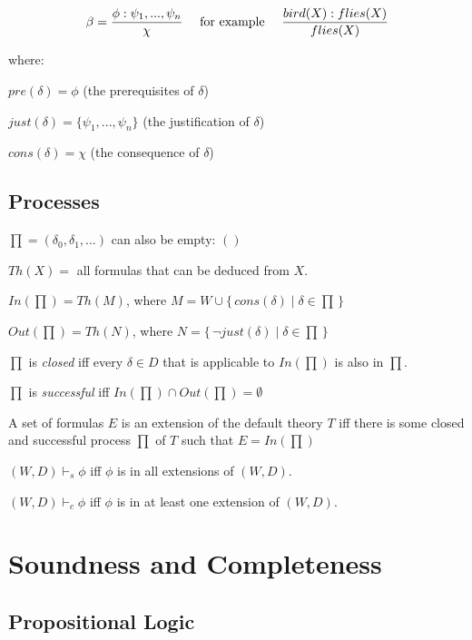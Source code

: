 \documentclass[a4paper]{article}
\begin{document}
\[
	\beta = \frac{\phi : \psi_1, ..., \psi_n}{\chi}
	\textrm{ \quad for example \quad }
	\frac{bird(X) : flies(X)}{flies(X)}
\]

where:
\begin{description}
	\item $pre(\delta) = \phi$ (the prerequisites of $\delta$)
	\item $just(\delta) = \lbrace \psi_1, ..., \psi_n \rbrace$ (the justification of $\delta$)
	\item $cons(\delta) = \chi$ (the consequence of $\delta$)
\end{description}

\subsection{Processes}

\begin{description}
	\item $\prod = (\delta_0, \delta_1, ...)$ \quad can also be empty: $()$
	\item $Th(X) = $ all formulas that can be deduced from $X$.
	\item $In(\prod) = Th(M)$, where $M = W \cup \lbrace\, cons(\delta) \;|\; \delta \in \prod \,\rbrace$
	\item $Out(\prod) = Th(N)$, where $N = \lbrace\, \lnot just(\delta) \;|\; \delta \in \prod \,\rbrace$
	\item $\prod$ is \emph{closed} iff every $\delta \in D$ that is applicable to $In(\prod)$ is also in $\prod$.
	\item $\prod$ is \emph{successful} iff $In(\prod) \cap Out(\prod) = \emptyset$
	\item[Extensions] A set of formulas $E$ is an extension of the default theory $T$ iff there is some closed and successful process $\prod$ of $T$ such that $E = In(\prod)$
	\item[Skeptical consequence] $(W, D) \vdash_s \phi$ iff $\phi$ is in all extensions of $(W, D)$.
	\item[Credulous consequence] $(W, D) \vdash_c \phi$ iff $\phi$ is in at least one extension of $(W, D)$.
\end{description}

\section{Soundness and Completeness}

\subsection{Propositional Logic}
\end{document}
